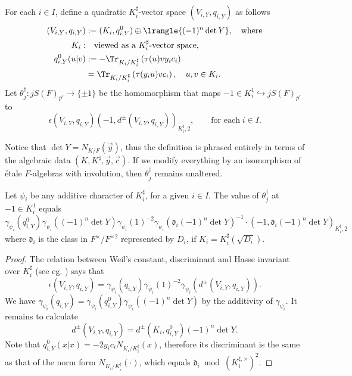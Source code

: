 \documentclass[a4paper,10pt]{article}
\begin{document}
\begin{definition}\label{def:dagger}
	For each $i \in I$, define a quadratic $K_i^\sharp$-vector space $(V_{i,Y}, q_{i,Y})$ as follows
	\begin{align*}
		\left( V_{i,Y}, q_{i,Y} \right) & := (K_i, q_{i,Y}^0) \oplus \lrangle{ (-1)^n \det Y }, \quad \text{where} \\
		K_i: & \quad \text{viewed as a $K_i^\sharp$-vector space}, \\
		q^0_{i,Y}(u|v) & := -\Tr_{K_i/K_i^\sharp} \left( \tau(u)v y_i c_i \right) \\
		& = \Tr_{K_i/K_i^\sharp} \left( \tau(y_i u)v c_i \right), \quad u,v \in K_i.
	\end{align*}
	Let $\theta_j^\dagger: jS(F)_{p'} \to \{ \pm 1\}$ be the homomorphism that maps $-1 \in K_i^1 \hookrightarrow jS(F)_{p'}$ to
	\[ \epsilon(V_{i,Y}, q_{i,Y}) \left(-1, d^\pm(V_{i,Y}, q_{i,Y})\right)_{K_i^\sharp, 2} , \qquad \text{for each}\; i \in I. \]
\end{definition}
Notice that $\det Y = N_{K/F}(\vec{y})$, thus the definition is phrased entirely in terms of the algebraic data $(K, K^\sharp, \vec{y}, \vec{c})$. If we modify everything by an isomorphism of étale $F$-algebras with involution, then $\theta_j^\dagger$ remains unaltered.

\begin{lemma}\label{prop:dagger-Weil}
	Let $\psi_i$ be any additive character of $K_i^\sharp$, for a given $i \in I$. The value of $\theta_j^\dagger$ at $-1 \in K_i^1$ equals
	\[ \gamma_{\psi_i} (q_{i,Y}^0) \gamma_{\psi_i}((-1)^n \det Y) \gamma_{\psi_i}(1)^{-2} \gamma_{\psi_i}\left( \mathfrak{d}_i (-1)^n \det Y \right)^{-1} \cdot \left(-1, \mathfrak{d}_i (-1)^n \det Y \right)_{K_i^\sharp, 2} \]
	where $\mathfrak{d}_i$ is the class in $F^\times/F^{\times 2}$ represented by $D_i$, if $K_i = K_i^\sharp(\sqrt{D_i})$.
\end{lemma}
\begin{proof}
	The relation between Weil's constant, discriminant and Hasse invariant over $K_i^\sharp$ (see eg. \cite[1.3.4]{Per81}) says that
	\[ \epsilon(V_{i,Y}, q_{i,Y}) = \gamma_{\psi_i}( q_{i,Y} ) \gamma_{\psi_i}(1)^{-2} \gamma_{\psi_i}\left(d^\pm(V_{i,Y}, q_{i,Y})\right). \]
	We have $\gamma_{\psi_i}(q_{i,Y}) = \gamma_{\psi_i}(q_{i,Y}^0) \gamma_{\psi_i}((-1)^n \det Y)$ by the additivity of $\gamma_{\psi_i}$. It remains to calculate
	\[ d^\pm(V_{i,Y}, q_{i,Y}) = d^\pm(K_i, q_{i,Y}^0) (-1)^n \det Y. \]
	Note that $q_{i,Y}^0(x|x) = -2y_i c_i N_{K_i/K_i^\sharp}(x)$, therefore its discriminant is the same as that of the norm form $N_{K_i/K_i^\sharp}(\cdot)$, which equals $\mathfrak{d}_i \bmod (K_i^{\sharp, \times})^2$.
\end{proof}
\end{document}
